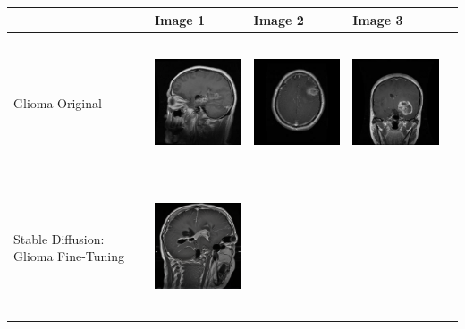 
\begin{table}[H]
\centering
\begin{tabularx}{\linewidth}{@{}>{\centering\arraybackslash}m{3cm}>{\centering\arraybackslash}X>{\centering\arraybackslash}X>{\centering\arraybackslash}X>{\centering\arraybackslash}X@{}}
\toprule
 & Image 1 & Image 2 & Image 3 \\
\midrule
Glioma Original &
\includegraphics[valign=M,width=\linewidth,height=4cm,keepaspectratio]{main/content/images/brain_dreambooth_comparison/real/Tr-gl_0050.jpg} & 
\includegraphics[valign=M,width=\linewidth,height=4cm,keepaspectratio]{main/content/images/brain_dreambooth_comparison/real/Tr-gl_0165.jpg} & 
\includegraphics[valign=M,width=\linewidth,height=4cm,keepaspectratio]{main/content/images/brain_dreambooth_comparison/real/Tr-gl_0475.jpg} \\
\midrule
Stable Diffusion: Glioma Fine-Tuning & 
\includegraphics[valign=M,width=\linewidth,height=4cm,keepaspectratio]{main/content/images/brain_dreambooth_comparison/synthetic/0.png} & 

\end{tabularx}
\end{table}
